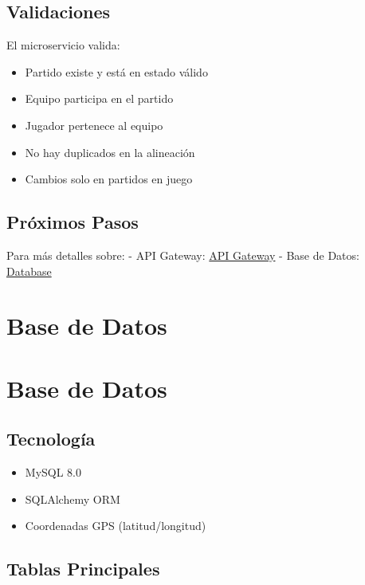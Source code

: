 \documentclass[
  spanish,
  11pt,
  letterpaper,
]{book}
\providecommand{\tightlist}{%
  \setlength{\itemsep}{0pt}\setlength{\parskip}{0pt}}
\begin{document}
\section{Validaciones}\label{validaciones}

El microservicio valida:

\begin{itemize}
\tightlist
\item
  Partido existe y está en estado válido
\item
  Equipo participa en el partido
\item
  Jugador pertenece al equipo
\item
  No hay duplicados en la alineación
\item
  Cambios solo en partidos en juego
\end{itemize}

\section{Próximos Pasos}\label{pruxf3ximos-pasos-5}

Para más detalles sobre: - API Gateway: \hyperref[api-gateway]{API
Gateway} - Base de Datos: \href{database.qmd}{Database}

\chapter{Base de Datos}\label{base-de-datos}

\chapter{Base de Datos}\label{base-de-datos-1}

\section{Tecnología}\label{tecnologuxeda}

\begin{itemize}
\tightlist
\item
  MySQL 8.0
\item
  SQLAlchemy ORM
\item
  Coordenadas GPS (latitud/longitud)
\end{itemize}

\section{Tablas Principales}\label{tablas-principales}
\end{document}

